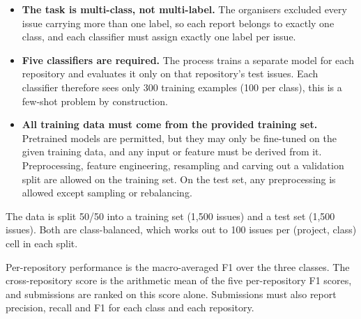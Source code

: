 \begin{itemize}
    \item \textbf{The task is multi-class, not multi-label.} The organisers excluded
    every issue carrying more than one label, so each report belongs to exactly one class,
    and each classifier must assign exactly one label per issue.
    
    \item \textbf{Five classifiers are required.} The process trains a separate
    model for each repository and evaluates it only on that repository's test issues.
    Each classifier therefore sees only 300 training examples (100 per class), this is a few-shot problem by construction.

    \item \textbf{All training data must come from the provided training set.}
    Pretrained models are permitted, but they may only be fine-tuned on the given
    training data, and any input or feature must be derived from it. Preprocessing,
    feature engineering, resampling and carving out a validation split are allowed
    on the training set. On the test set, any preprocessing is allowed except
    sampling or rebalancing.
\end{itemize}

\noindent The data is split 50/50 into a training set (1,500 issues) and a test set
(1,500 issues). Both are class-balanced, which works out to 100 issues per
(project, class) cell in each split.

\noindent Per-repository performance is the macro-averaged F1 over the three classes. The cross-repository score is the arithmetic mean of the five per-repository F1 scores, and submissions are ranked on this score alone. Submissions must also report precision, recall and F1 for each class and each repository.

